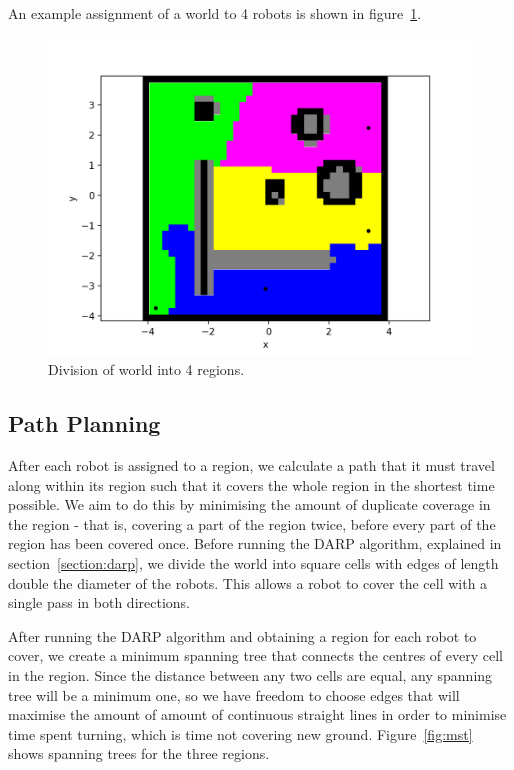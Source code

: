 \documentclass[a4paper, 10pt, conference]{ieeeconf}      %
\begin{document}
An example assignment of a world to 4 robots is shown in figure~\ref{fig:darp}.

\begin{figure}
	\centering
	\includegraphics[width=\columnwidth]{figure_darp.png}
	\caption{Division of world into 4 regions.}
	\label{fig:darp}
\end{figure}
   
\subsection{Path Planning}
After each robot is assigned to a region, we calculate a path that it must travel along within its region such that it covers the whole region in the shortest time possible. We aim to do this by minimising the amount of duplicate coverage in the region - that is, covering a part of the region twice, before every part of the region has been covered once. Before running the DARP algorithm, explained in section~\ref{section:darp}, we divide the world into square cells with edges of length double the diameter of the robots. This allows a robot to cover the cell with a single pass in both directions.

After running the DARP algorithm and obtaining a region for each robot to cover, we create a minimum spanning tree that connects the centres of every cell in the region. Since the distance between any two cells are equal, any spanning tree will be a minimum one, so we have freedom to choose edges that will maximise the amount of amount of continuous straight lines in order to minimise time spent turning, which is time not covering new ground. Figure~\ref{fig:mst} shows spanning trees for the three regions.
\end{document}
